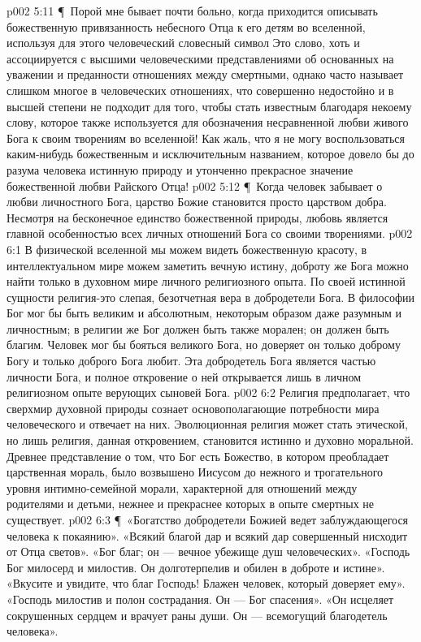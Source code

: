 \vs p002 5:11 \P\ Порой мне бывает почти больно, когда приходится описывать божественную привязанность небесного Отца к его детям во вселенной, используя для этого человеческий словесный символ  Это слово, хоть и ассоциируется с высшими человеческими представлениями об основанных на уважении и преданности отношениях между смертными, однако часто называет слишком многое в человеческих отношениях, что совершенно недостойно и в высшей степени не подходит для того, чтобы стать известным благодаря некоему слову, которое также используется для обозначения несравненной любви живого Бога к своим творениям во вселенной! Как жаль, что я не могу воспользоваться каким\hyp{}нибудь божественным и исключительным названием, которое довело бы до разума человека истинную природу и утонченно прекрасное значение божественной любви Райского Отца!
\vs p002 5:12 \P\ Когда человек забывает о любви личностного Бога, царство Божие становится просто царством добра. Несмотря на бесконечное единство божественной природы, любовь является главной особенностью всех личных отношений Бога со своими творениями.
\vs p002 6:1 В физической вселенной мы можем видеть божественную красоту, в интеллектуальном мире можем заметить вечную истину, доброту же Бога можно найти только в духовном мире личного религиозного опыта. По своей истинной сущности религия\hyp{}это слепая, безотчетная вера в добродетели Бога. В философии Бог мог бы быть великим и абсолютным, некоторым образом даже разумным и личностным; в религии же Бог должен быть также морален; он должен быть благим. Человек мог бы бояться великого Бога, но доверяет он только доброму Богу и только доброго Бога любит. Эта добродетель Бога является частью личности Бога, и полное откровение о ней открывается лишь в личном религиозном опыте верующих сыновей Бога.
\vs p002 6:2 Религия предполагает, что сверхмир духовной природы сознает основополагающие потребности мира человеческого и отвечает на них. Эволюционная религия может стать этической, но лишь религия, данная откровением, становится истинно и духовно моральной. Древнее представление о том, что Бог есть Божество, в котором преобладает царственная мораль, было возвышено Иисусом до нежного и трогательного уровня интимно\hyp{}семейной морали, характерной для отношений между родителями и детьми, нежнее и прекраснее которых в опыте смертных не существует.
\vs p002 6:3 \P\ «Богатство добродетели Божией ведет заблуждающегося человека к покаянию». «Всякий благой дар и всякий дар совершенный нисходит от Отца светов». «Бог благ; он --- вечное убежище душ человеческих». «Господь Бог милосерд и милостив. Он долготерпелив и обилен в доброте и истине». «Вкусите и увидите, что благ Господь! Блажен человек, который доверяет ему». «Господь милостив и полон сострадания. Он --- Бог спасения». «Он исцеляет сокрушенных сердцем и врачует раны души. Он --- всемогущий благодетель человека».
